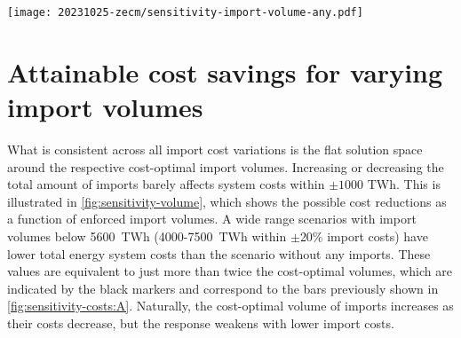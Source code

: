 

\begin{figure*}
    \texttt{[image: 20231025-zecm/sensitivity-import-volume-any.pdf]}
    \caption{\textbf{Sensitivity of import volume on total system cost and composition.} 
        Dashed line splits total system cost into domestic and foreign cost.
        Dotted lines indicate the profile of lowest total system cost attainable for given import volumes and different levels of import costs.
        The black markers denote the maximum cost reductions and cost-optimal import volume for a given import cost level (extreme points of the profiles).
        Steel is included in energy terms applying 2.1 kWh/kg as released by the oxidation of iron.
        Cost alterations are uniformly applied to all imports but electricity.
    }
    \label{fig:sensitivity-volume}
\end{figure*}


\section*{Attainable cost savings for varying import volumes}

What is consistent across all import cost variations is the flat solution space
around the respective cost-optimal import volumes. Increasing or decreasing the
total amount of imports barely affects system costs within $\pm 1000$ TWh. This
is illustrated in \cref{fig:sensitivity-volume}, which shows the possible cost
reductions as a function of enforced import volumes. A wide range scenarios with
import volumes below 5600~TWh (4000-7500~TWh within $\pm$20\% import costs) have
lower total energy system costs than the scenario without any imports.
These values are equivalent
to just more than twice the cost-optimal volumes, which are indicated by the
black markers and correspond to the bars previously shown in
\cref{fig:sensitivity-costs:A}. Naturally, the cost-optimal volume of imports
increases as their costs decrease, but the response weakens with lower import
costs.

